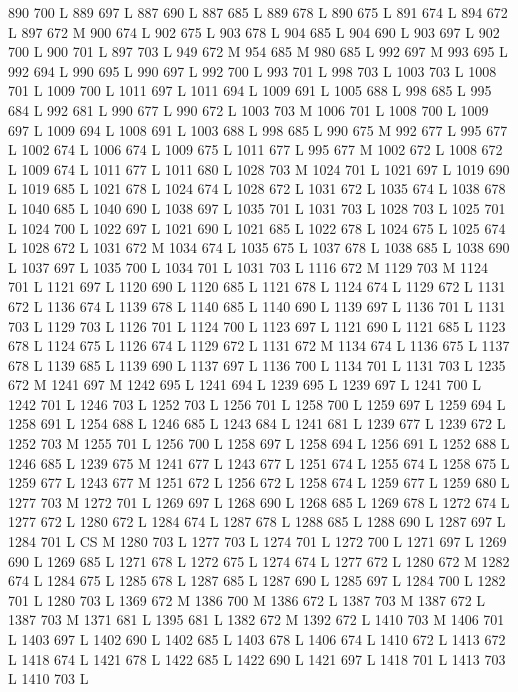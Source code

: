 {{{{{{{{{{{{{{{{{{{{{{{{{{{890 700 L
889 697 L
887 690 L
887 685 L
889 678 L
890 675 L
891 674 L
894 672 L
897 672 M 900 674 L
902 675 L
903 678 L
904 685 L
904 690 L
903 697 L
902 700 L
900 701 L
897 703 L
949 672 M 954 685 M 980 685 L
992 697 M 993 695 L
992 694 L
990 695 L
990 697 L
992 700 L
993 701 L
998 703 L
1003 703 L
1008 701 L
1009 700 L
1011 697 L
1011 694 L
1009 691 L
1005 688 L
998 685 L
995 684 L
992 681 L
990 677 L
990 672 L
1003 703 M 1006 701 L
1008 700 L
1009 697 L
1009 694 L
1008 691 L
1003 688 L
998 685 L
990 675 M 992 677 L
995 677 L
1002 674 L
1006 674 L
1009 675 L
1011 677 L
995 677 M 1002 672 L
1008 672 L
1009 674 L
1011 677 L
1011 680 L
1028 703 M 1024 701 L
1021 697 L
1019 690 L
1019 685 L
1021 678 L
1024 674 L
1028 672 L
1031 672 L
1035 674 L
1038 678 L
1040 685 L
1040 690 L
1038 697 L
1035 701 L
1031 703 L
1028 703 L
1025 701 L
1024 700 L
1022 697 L
1021 690 L
1021 685 L
1022 678 L
1024 675 L
1025 674 L
1028 672 L
1031 672 M 1034 674 L
1035 675 L
1037 678 L
1038 685 L
1038 690 L
1037 697 L
1035 700 L
1034 701 L
1031 703 L
1116 672 M 1129 703 M 1124 701 L
1121 697 L
1120 690 L
1120 685 L
1121 678 L
1124 674 L
1129 672 L
1131 672 L
1136 674 L
1139 678 L
1140 685 L
1140 690 L
1139 697 L
1136 701 L
1131 703 L
1129 703 L
1126 701 L
1124 700 L
1123 697 L
1121 690 L
1121 685 L
1123 678 L
1124 675 L
1126 674 L
1129 672 L
1131 672 M 1134 674 L
1136 675 L
1137 678 L
1139 685 L
1139 690 L
1137 697 L
1136 700 L
1134 701 L
1131 703 L
1235 672 M 1241 697 M 1242 695 L
1241 694 L
1239 695 L
1239 697 L
1241 700 L
1242 701 L
1246 703 L
1252 703 L
1256 701 L
1258 700 L
1259 697 L
1259 694 L
1258 691 L
1254 688 L
1246 685 L
1243 684 L
1241 681 L
1239 677 L
1239 672 L
1252 703 M 1255 701 L
1256 700 L
1258 697 L
1258 694 L
1256 691 L
1252 688 L
1246 685 L
1239 675 M 1241 677 L
1243 677 L
1251 674 L
1255 674 L
1258 675 L
1259 677 L
1243 677 M 1251 672 L
1256 672 L
1258 674 L
1259 677 L
1259 680 L
1277 703 M 1272 701 L
1269 697 L
1268 690 L
1268 685 L
1269 678 L
1272 674 L
1277 672 L
1280 672 L
1284 674 L
1287 678 L
1288 685 L
1288 690 L
1287 697 L
1284 701 L
CS M
1280 703 L
1277 703 L
1274 701 L
1272 700 L
1271 697 L
1269 690 L
1269 685 L
1271 678 L
1272 675 L
1274 674 L
1277 672 L
1280 672 M 1282 674 L
1284 675 L
1285 678 L
1287 685 L
1287 690 L
1285 697 L
1284 700 L
1282 701 L
1280 703 L
1369 672 M 1386 700 M 1386 672 L
1387 703 M 1387 672 L
1387 703 M 1371 681 L
1395 681 L
1382 672 M 1392 672 L
1410 703 M 1406 701 L
1403 697 L
1402 690 L
1402 685 L
1403 678 L
1406 674 L
1410 672 L
1413 672 L
1418 674 L
1421 678 L
1422 685 L
1422 690 L
1421 697 L
1418 701 L
1413 703 L
1410 703 L
}}}}}}}}}}}}}}}}}}}}}}}}}}}
